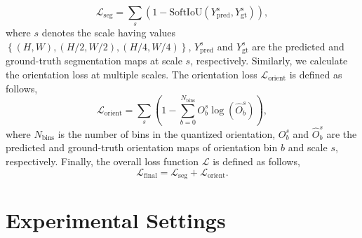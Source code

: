 \documentclass[letterpaper, 10 pt, conference]{ieeeconf}
\begin{document}
\begin{equation}
	\mathcal{L}_{\text{seg}}  =  \sum_{s} \left(1 - \mathrm{SoftIoU}(Y_{\text{pred}}^{s}, Y_{\text{gt}}^{s}) \right),
\end{equation}
where $s$ denotes the scale having values $\left\{ (H,W), (H/2,W/2), (H/4, W/4) \right\}$, $Y_{\text{pred}}^{s}$ and $Y_{\text{gt}}^{s}$ are the predicted and ground-truth segmentation maps at scale $s$, respectively. Similarly, we calculate the orientation loss at multiple scales. The orientation loss $\mathcal{L}_{\text{orient}}$ is defined as follows,
\begin{equation}
	\mathcal{L}_{\text{orient}} =  \sum_{s} \left(1 - \sum_{b=0}^{N_{\text{bins}}} O_b^s \log(\hat{O}_b^s)\right),
\end{equation}
where $N_{\text{bins}}$ is the number of bins in the quantized orientation, $O_{b}^{s}$ and $\hat{O}_{b}^{s}$  are the predicted and ground-truth orientation maps of orientation bin $b$ and scale $s$, respectively. Finally, the overall loss  function $\mathcal{L}$ is defined as follows,
\begin{equation}
	\mathcal{L}_{\text{final}} = \mathcal{L}_{\text{seg}} + \mathcal{L}_{\text{orient}}.
\end{equation}
\section{Experimental Settings}
\end{document}
